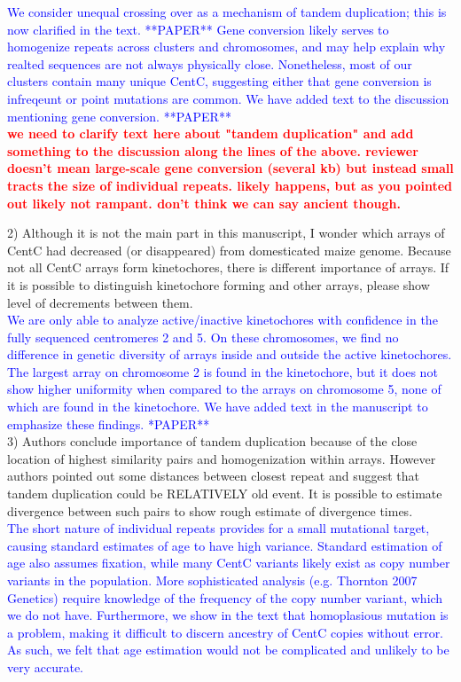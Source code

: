 \documentclass[]{article}
\newcommand{\res}[1]{\noindent \textcolor{blue}{{#1}} \\}
\newcommand{\jri}[1]{\textcolor{red}{{\bf #1}} }
\begin{document}
\res{We consider unequal crossing over as a mechanism of tandem duplication; this is now clarified in the text. **PAPER**
Gene conversion likely serves to homogenize repeats across clusters and chromosomes, and may help explain why realted sequences are not always physically close.
Nonetheless, most of our clusters contain many unique CentC, suggesting either that gene conversion is infreqeunt or point mutations are common. 
We have added text to the discussion mentioning gene conversion. **PAPER**} 
\jri{we need to clarify text here about "tandem duplication" and add something to the discussion along the lines of the above.  reviewer doesn't mean large-scale gene conversion (several kb) but instead small tracts the size of individual repeats.  likely happens, but as you pointed out likely not rampant.  don't think we can say ancient though.\\} 

2) Although it is not the main part in this manuscript, I wonder which arrays of CentC had decreased (or disappeared) from domesticated maize genome. Because not all CentC arrays form kinetochores, there is different importance of arrays. If it is possible to distinguish kinetochore forming and other arrays, please show level of decrements between them.\\

\res{We are only able to analyze active/inactive kinetochores with confidence in the fully sequenced centromeres 2 and 5.  
On these chromosomes, we find no difference in genetic diversity of arrays inside and outside the active kinetochores.  
The largest array on chromosome 2 is found in the kinetochore, but it does not show higher uniformity when compared to the arrays on chromosome 5, none of which are found in the kinetochore.  
We have added text in the manuscript to emphasize these findings. *PAPER**}

3) Authors conclude importance of tandem duplication because of the close location of highest similarity pairs and homogenization within arrays. However authors pointed out some distances between closest repeat and suggest that tandem duplication could be RELATIVELY old event. It is possible to estimate divergence between such pairs to show rough estimate of divergence times.\\

\res{The short nature of individual repeats provides for a small mutational target, causing standard estimates of age to have high variance.  
Standard estimation of age also assumes fixation, while many CentC variants likely exist as copy number variants in the population. 
More sophisticated analysis (e.g. Thornton 2007 Genetics) require knowledge of the frequency of the copy number variant, which we do not have.
Furthermore, we show in the text that homoplasious mutation is a problem, making it difficult to discern ancestry of CentC copies without error.  
As such, we felt that age estimation would not be complicated and unlikely to be very accurate.}
\end{document}
